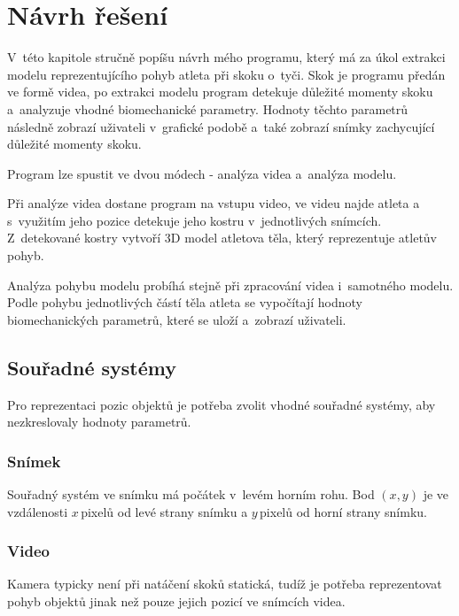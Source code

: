 \chapter{Návrh řešení}

V~této kapitole stručně popíšu návrh mého programu, který má za úkol extrakci modelu reprezentujícího pohyb atleta při skoku o~tyči. Skok je programu předán ve formě videa, po extrakci modelu program detekuje důležité momenty skoku a~analyzuje vhodné biomechanické parametry. Hodnoty těchto parametrů následně zobrazí uživateli v~grafické podobě a~také zobrazí snímky zachycující důležité momenty skoku.

Program lze spustit ve dvou módech - analýza videa a~analýza modelu.

Při analýze videa dostane program na vstupu video, ve videu najde atleta a s~využitím jeho pozice detekuje jeho kostru v~jednotlivých snímcích. Z~detekované kostry vytvoří 3D model atletova těla, který reprezentuje atletův pohyb.

Analýza pohybu modelu probíhá stejně při zpracování videa i~samotného modelu. Podle pohybu jednotlivých částí těla atleta se vypočítají hodnoty biomechanických parametrů, které se uloží a~zobrazí uživateli.




\section{Souřadné systémy}
\label{sec:ssystemy}

Pro reprezentaci pozic objektů je potřeba zvolit vhodné souřadné systémy, aby nezkreslovaly hodnoty parametrů.



\subsection{Snímek}

Souřadný systém ve snímku má počátek v~levém horním rohu. Bod $(x,y)$ je ve vzdálenosti $x$\,\rm pixelů od levé strany snímku a $y$\,\rm pixelů od horní strany snímku.



\subsection{Video}

Kamera typicky není při natáčení skoků statická, tudíž je potřeba reprezentovat pohyb objektů jinak než pouze jejich pozicí ve snímcích videa.

